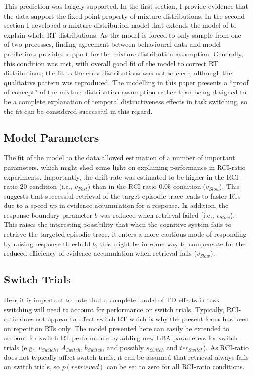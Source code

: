 \documentclass[a4paper, jou, natbib]{apa6}
\begin{document}
This prediction was largely supported. In the first section, I provide evidence that the data support the fixed-point property of mixture distributions. In the second section I developed a mixture-distribution model that extends the model of \cite{Grange2015} to explain whole RT-distributions. As the model is forced to only sample from one of two processes, finding agreement between behavioural data and model predictions provides support for the mixture-distribution assumption. Generally, this condition was met, with overall good fit of the model to correct RT distributions; the fit to the error distributions was not so clear, although the qualitative pattern was reproduced. The modelling in this paper presents a ``proof of concept'' of the mixture-distribution assumption rather than being designed to be a complete explanation of temporal distinctiveness effects in task switching, so the fit can be considered successful in this regard.

\subsection{Model Parameters}
The fit of the model to the data allowed estimation of a number of important parameters, which might shed some light on explaining performance in RCI-ratio experiments. Importantly, the drift rate was estimated to be higher in the RCI-ratio 20 condition (i.e., $v_{Fast}$) than in the RCI-ratio 0.05 condition ($v_{Slow}$). This suggests that successful retrieval of the target episodic trace leads to faster RTs due to a speed-up in evidence accumulation for a response. In addition, the response boundary parameter $b$ was reduced when retrieval failed (i.e., $v_{Slow}$). This raises the interesting possibility that when the cognitive system fails to retrieve the targeted episodic trace, it enters a more cautious mode of responding by raising response threshold $b$; this might be in some way to compensate for the reduced efficiency of evidence accumulation when retrieval fails ($v_{Slow}$).
 
\subsection{Switch Trials}
Here it is important to note that a complete model of TD effects in task switching will need to account for performance on switch trials. Typically, RCI-ratio does not appear to affect switch RT \citep{Horoufchin2011, Horoufchin2011a} which is why the present focus has been on repetition RTs only. The model presented here can easily be extended to account for switch RT performance by adding new LBA parameters for switch trials (e.g., $v_{Switch}$, $A_{Switch}$, $b_{Switch}$, and possibly $s_{Switch}$ and  $ter_{Switch}$). As RCI-ratio does not typically affect switch trials, it can be assumed that retrieval always fails on switch trials, so $p(retrieved)$ can be set to zero for all RCI-ratio conditions. 
\end{document}
